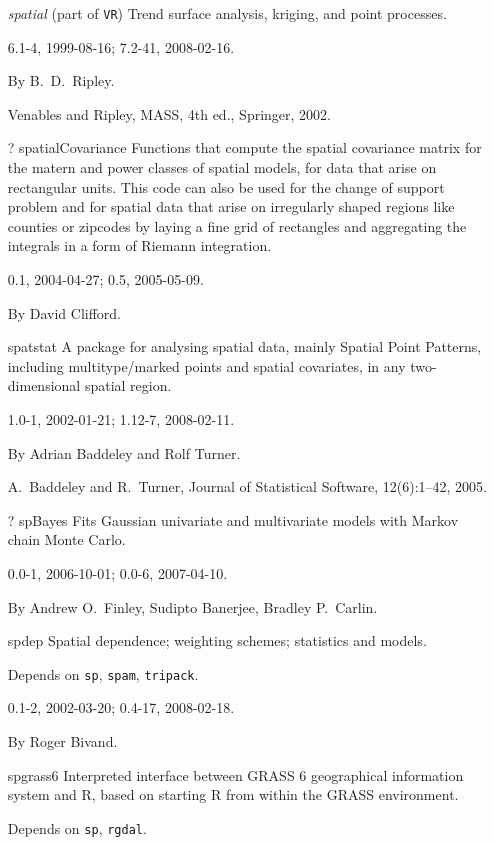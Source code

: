 \documentclass[12pt]{article}
\begin{document}
\begin{itemize}
\item[\emph{spatial}]
(part of \texttt{VR})
Trend surface analysis, kriging, and point processes.

6.1-4, 1999-08-16; 7.2-41, 2008-02-16.

By B.\ D.\ Ripley.

Venables and Ripley, MASS, 4th ed., Springer, 2002.

\item[? spatialCovariance]
Functions that compute the spatial covariance matrix for the matern and
power classes of spatial models, for data that arise on rectangular
units. This code can also be used for the change of support problem and
for spatial data that arise on irregularly shaped regions like counties
or zipcodes by laying a fine grid of rectangles and aggregating the
integrals in a form of Riemann integration.

0.1, 2004-04-27; 0.5, 2005-05-09.

By David Clifford.

\item[spatstat]
A package for analysing spatial data, mainly Spatial Point Patterns,
including multitype/marked points and spatial covariates, in any
two-dimensional spatial region.

1.0-1, 2002-01-21; 1.12-7, 2008-02-11.

By Adrian Baddeley and Rolf Turner.

A.\ Baddeley and R.\ Turner, Journal of Statistical Software,
12(6):1--42, 2005.

\item[? spBayes]
Fits Gaussian univariate and multivariate models with Markov chain Monte
Carlo.

0.0-1, 2006-10-01; 0.0-6, 2007-04-10.

By Andrew O.\ Finley, Sudipto Banerjee, Bradley P.\ Carlin.

\item[spdep]
Spatial dependence; weighting schemes; statistics and models.

Depends on \texttt{sp}, \texttt{spam}, \texttt{tripack}.

0.1-2, 2002-03-20; 0.4-17, 2008-02-18.

By Roger Bivand.

\item[spgrass6]
Interpreted interface between GRASS 6 geographical information system
and R, based on starting R from within the GRASS environment.

Depends on \texttt{sp}, \texttt{rgdal}.


\end{itemize}
\end{document}
